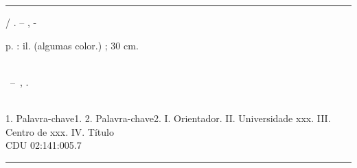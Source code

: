 %
%     

\begin{fichacatalografica}
	\vspace*{\fill}					%
	\hrule							    %
	\begin{center}					%
	\begin{minipage}[c]{12.5cm}		%
	
	\imprimirautor
	
	\hspace{0.5cm} \imprimirtitulo  / \imprimirautor. --
	\imprimirlocal, \imprimirdata-
	
	\hspace{0.5cm} \pageref{LastPage} p. : il. (algumas color.) ; 30 cm.\\
	
	\hspace{0.5cm} \imprimirorientadorRotulo~\imprimirorientador\\
	
	\hspace{0.5cm}
	\parbox[t]{\textwidth}{\imprimirtipotrabalho~--~\imprimirinstituicao,
	\imprimirdata.}\\
	
	\hspace{0.5cm}
		1. Palavra-chave1.
		2. Palavra-chave2.
		I. Orientador.
		II. Universidade xxx.
		III. Centro de xxx.
		IV. Título\\ 			
	
	\hspace{8.75cm} CDU 02:141:005.7\\
	
	\end{minipage}
	\end{center}
	\hrule
\end{fichacatalografica}
